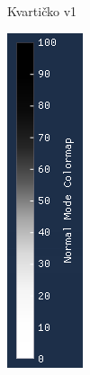 \documentclass[times, utf8, diplomski]{fer}
\begin{document}
\begin{figure} [H]
\begin{subfigure}[h]{0.16\textwidth}
         \caption{Kvartičko v1}
         \label{fig:quartic_legend}
     \end{subfigure}
     \hfill
     \begin{subfigure}[h]{0.16\textwidth}
         \centering
         \includegraphics[width=\textwidth]{cubic_symmetrical_colormap.png}

\end{subfigure}
\end{figure}
\end{document}
